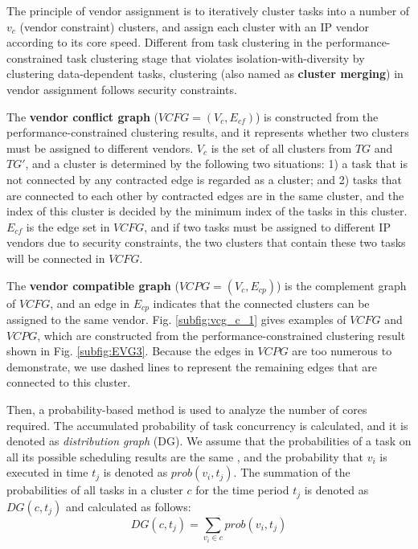 \documentclass[10pt,journal, compsoc]{IEEEtran}
\begin{document}
The principle of vendor assignment is to iteratively cluster tasks into a number of $v_c$ (vendor constraint) clusters, and assign each cluster with an IP vendor according to its core speed. Different from task clustering in the performance-constrained task clustering stage that violates isolation-with-diversity by clustering data-dependent tasks, clustering (also named as \textbf{cluster merging}) in vendor assignment follows security constraints.

The \textbf{vendor conflict graph} ($VCFG=(V_c, E_{cf})$) is constructed from the performance-constrained clustering results, and it represents whether two clusters must be assigned to different vendors. $V_c$ is the set of all clusters from $TG$ and $TG'$, and a cluster is determined by the following two situations: 1) a task that is not connected by any contracted edge is regarded as a cluster; and 2) tasks that are connected to each other by contracted edges are in the same cluster, and the index of this cluster is decided by the minimum index of the tasks in this cluster. $E_{cf}$ is the edge set in $VCFG$, and if two tasks must be assigned to different IP vendors due to security constraints, the two clusters that contain these two tasks will be connected in $VCFG$.




The \textbf{vendor compatible graph} ($VCPG=(V_c, E_{cp})$) is the complement graph of $VCFG$, and an edge in $E_{cp}$ indicates that the connected clusters can be assigned to the same vendor. Fig. \ref{subfig:vcg_c_1} gives examples of $VCFG$ and $VCPG$, which are constructed from the performance-constrained clustering result shown in Fig. \ref{subfig:EVG3}. Because the edges in $VCPG$ are too numerous to demonstrate, we use dashed lines to represent the remaining edges that are connected to this cluster.


Then, a probability-based method is used to analyze the number of cores required. The accumulated probability of task concurrency is calculated, and it is denoted as \textit{distribution graph} (DG). We assume that the probabilities of a task on all its possible scheduling results are the same \cite{article:PP}, and the probability that $v_i$ is executed in time $t_j$ is denoted as $prob(v_i,t_j)$. The summation of the probabilities of all tasks in a cluster $c$ for the time period $t_j$ is denoted as $DG(c, t_j)$ and calculated as follows:
\begin{equation}
DG(c, t_j) = \sum \limits_{v_i\in c} prob(v_i, t_j)
\end{equation}
\end{document}

